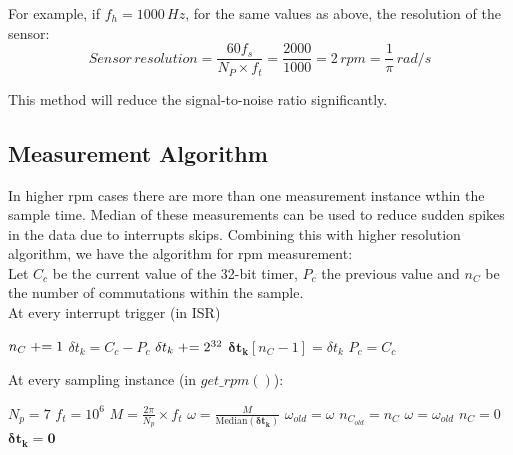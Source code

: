 For example, if $f_h = 1000\, Hz$, for the same values as above, the resolution of the sensor:
$$Sensor \, resolution = \frac{60f_s}{N_P \times f_t} = \frac{2000}{1000} = 2 \, rpm = \frac{1}{\pi} \, rad/s$$

\par This method will reduce the signal-to-noise ratio significantly.

\subsection{Measurement Algorithm}
\par In higher rpm cases there are more than one measurement instance wthin
the sample time. Median of these measurements can be used to reduce sudden spikes in the data due to interrupts skips. Combining this with
higher resolution algorithm, we have the algorithm for rpm measurement:\\

Let $C_c$ be the current value of the 32-bit timer, $P_c$ the previous value and $n_C$ be the number of commutations within the sample.\\

At every interrupt trigger (in ISR)

    \begin{algorithm}[H]
        $n_C \mathrel{+}= 1$\;
        $\delta t_k = C_c - P_c$\;
            {$\delta t_k \mathrel{+}= 2^{32}$ }
        $\pmb{\delta t_k} [n_C-1] =  \delta t_k$\;
        $P_c = C_c$\;
    \end{algorithm}


\bigskip

At every sampling instance (in $get\_rpm()$):

    \begin{algorithm}[H]
        $N_p = 7$\;
        $f_t = 10^6$\;
        $M = \frac{2 \pi}{N_p} \times f_t$\;
            {$\omega = \frac{M}{\text{Median}(\pmb{\delta t_k})}$ 
             $ \omega_{old} = \omega$\;
             $n_{C_{old}} = n_C$\;
            }
             {$\omega = \omega_{old}$}
        $n_C = 0$\;
        $\pmb{\delta t_k} = \pmb 0$\;
    \end{algorithm}


\bigskip

